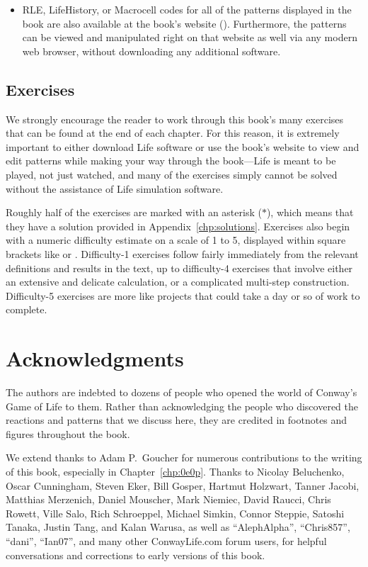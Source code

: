 \begin{itemize}
	\item RLE, LifeHistory, or Macrocell codes for all of the patterns displayed in the book are also available at the book's website (). Furthermore, the patterns can be viewed and manipulated right on that website as well via any modern web browser, without downloading any additional software.\medskip
\end{itemize}


\subsection*{Exercises}

We strongly encourage the reader to work through this book's many exercises that can be found at the end of each chapter. For this reason, it is extremely important to either download Life software or use the book's website to view and edit patterns while making your way through the book---Life is meant to be played, not just watched, and many of the exercises simply cannot be solved without the assistance of Life simulation software.

Roughly half of the exercises are marked with an asterisk ($\ast$), which means that they have a solution provided in Appendix~\ref{chp:solutions}. Exercises also begin with a numeric difficulty estimate on a scale of 1 to 5, displayed within square brackets like  or . Difficulty-1 exercises follow fairly immediately from the relevant definitions and results in the text, up to difficulty-4 exercises that involve either an extensive and delicate calculation, or a complicated multi-step construction. Difficulty-5 exercises are more like projects that could take a day or so of work to complete.


\section*{Acknowledgments}

The authors are indebted to dozens of people who opened the world of Conway's Game of Life to them. Rather than acknowledging the people who discovered the reactions and patterns that we discuss here, they are credited in footnotes and figures throughout the book.

We extend thanks to Adam P.~Goucher for numerous contributions to the writing of this book, especially in Chapter~\ref{chp:0e0p}. Thanks to Nicolay Beluchenko, Oscar Cunningham, Steven Eker, Bill Gosper, Hartmut Holzwart, Tanner Jacobi, Matthias Merzenich, Daniel Mouscher, Mark Niemiec, David Raucci, Chris Rowett, Ville Salo, Rich Schroeppel, Michael Simkin, Connor Steppie, Satoshi Tanaka, Justin Tang, and Kalan Warusa, as well as ``AlephAlpha'', ``Chris857'', ``dani'', ``Ian07'', and many other ConwayLife.com forum users, for helpful conversations and corrections to early versions of this book.

